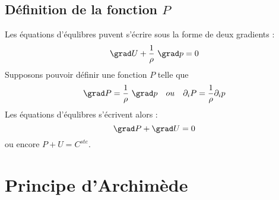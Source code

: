 \subsection{Définition de la fonction $P$}
Les équations d'équlibres puvent s'écrire sous la forme de deux gradients :
\begin{equation}
	\grad U + \dfrac{1}{\rho}\ \grad p = 0
\end{equation}
Supposons pouvoir définir une fonction $P$ telle que
\begin{equation}
	\grad P = \dfrac{1}{\rho}\ \grad p\ \ \ ou\ \ \ \partial_iP = \dfrac{1}{\rho}
	\partial_i p
\end{equation}
Les équations d'équlibres s'écrivent alors :
\begin{equation}
	\grad P + \grad U = 0
\end{equation}
ou encore $P + U = C^{ste}$.
	
	
\section{Principe d'Archimède}
